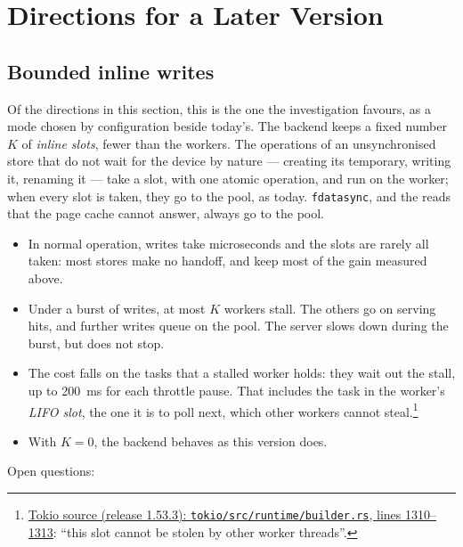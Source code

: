 \section{Directions for a Later Version}
\label{app:executor-directions}

\subsection{Bounded inline writes}
\label{app:executor-bounded}

Of the directions in this section, this is the one the investigation
favours, as a mode chosen by configuration beside today's. The backend
keeps a fixed number $K$ of
\emph{inline slots}, fewer than the workers. The operations of an
unsynchronised store that do not wait for the device by nature --- creating
its temporary, writing it, renaming it --- take a slot, with one atomic
operation, and run on the worker; when every slot is taken, they go to the
pool, as today. \texttt{fdatasync}, and the reads that the page cache cannot
answer, always go to the pool.
\begin{itemize}
  \item In normal operation, writes take microseconds and the slots are
    rarely all taken: most stores make no handoff, and keep most of the gain
    measured above.
  \item Under a burst of writes, at most $K$ workers stall. The others go on
    serving hits, and further writes queue on the pool. The server slows
    down during the burst, but does not stop.
  \item The cost falls on the tasks that a stalled worker holds: they wait
    out the stall, up to 200~ms for each throttle pause. That includes the
    task in the worker's \emph{LIFO slot}, the one it is to poll next, which
    other workers cannot
    steal.\footnote{\href{https://github.com/tokio-rs/tokio/blob/tokio-1.53.3/tokio/src/runtime/builder.rs\#L1310-L1313}{Tokio
    source (release 1.53.3): \texttt{tokio/src/runtime/builder.rs}, lines
    1310--1313}: ``this slot cannot be stolen by other worker threads''.}
  \item With $K = 0$, the backend behaves as this version does.
\end{itemize}
Open questions:
